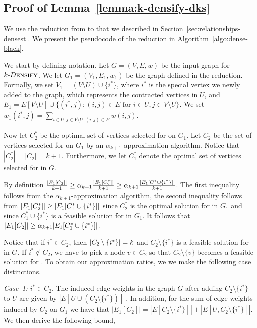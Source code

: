 \subsection{Proof of Lemma~\ref{lemma:k-densify-dks}}
\label{appendix:ds-proofs:kdensifydks}

We use the reduction from \kdense to \dksplus that we described in
Section~\ref{sec:relationships-densest}.  We present the pseudocode of the
reduction in Algorithm~\ref{algo:dense-black}.

We start by defining notation.
Let $G=(V,E,w)$ be the input graph for $k\text{-}{{\small D}\textsc{ensify}}$.
We let $G_1 = (V_1, E_1, w_1)$ be the graph defined in the reduction.
Formally, we set
$V_1 = (V \setminus U) \cup \{i^*\}$, where $i^*$ is the special vertex we newly
added to the graph, which represents the contracted vertices in $U$, and
$E_1 = E[V \setminus U] \cup \{(i^*, j)\colon (i,j) \in E \mbox{ for } i\in U, j \in V \setminus U\}$. 
We set $w_1(i^*,j) = \sum_{i \in U \colon j \in V \setminus U, (i,j)\in E} w(i,j)$. 

Now let $C_2^*$ be the optimal set of vertices selected for \dksplus
on $G_1$.  Let $C_2$ be the set of vertices selected for 
\dksplus on $G_1$ by an
$\alpha_{k+1}$-approximation algorithm.  Notice that $|C_2^*| = |C_2| = k+1$. 
Furthermore, we let $C_1^*$ denote the optimal set of vertices selected for
\kdense in $G$.

By definition $\frac{\lvert E_1[C_2]\rvert}{k+1} \geq \alpha_{k+1} \frac{\lvert E_1[C_2^*]\rvert}{k+1} \geq \alpha_{k+1} \frac{\lvert E_1[C_1^* \cup \{i^*\}]\rvert}{k+1}$.
The first inequality follows from the $\alpha_{k+1}$-approximation algorithm,
the second inequality follows from
$\lvert E_1[C_2^*]\rvert \geq \lvert E_1[C_1^* \cup \{i^*\}]\rvert$
since $C_2^*$ is the optimal solution for \dksplus in $G_1$ and since
$C_1^*\cup\{i^*\}$ is a feasible solution for \dksplus in $G_1$.
It follows that $\lvert E_1[C_2]\rvert \geq \alpha_{k+1} \lvert E_1[C_1^* \cup \{i^*\}]\rvert$. 

Notice that if $i^* \in C_2$, then $\lvert C_2 \setminus \{i^*\}\rvert = k$ and $C_2 \setminus \{i^*\}$ is a feasible solution for \kdense in $G$. 
If $i^* \notin C_2$, we have to pick a node $v \in C_2$ so that $C_2 \setminus \{v\}$ becomes a feasible solution for \kdense.
To obtain our approximation ratios, we we make the following case distinctions.

\emph{Case~1:} $i^* \in C_2$. The induced edge weights in the graph $G$ after adding
$C_2\setminus \{i^*\}$ to $U$ are given by $|E[U \cup (C_2 \setminus \{i^*\})]|$.
In addition, for the sum of edge weights induced by $C_2$ on $G_1$ we have that
$|E_1[C_2]|= |E[C_2 \setminus \{i^*\}]| + |E[U, C_2 \setminus \{i^*\}]|$. 
We then derive the following bound, 


